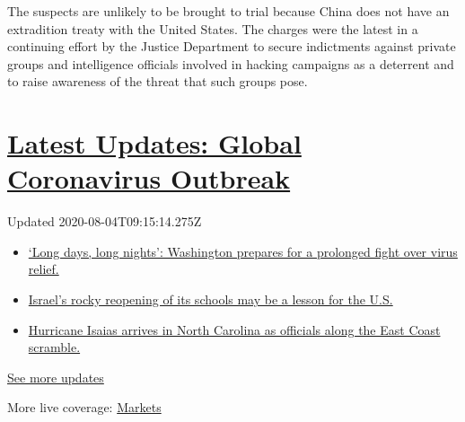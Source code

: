 The suspects are unlikely to be brought to trial because China does not
have an extradition treaty with the United States. The charges were the
latest in a continuing effort by the Justice Department to secure
indictments against private groups and intelligence officials involved
in hacking campaigns as a deterrent and to raise awareness of the threat
that such groups pose.

\hypertarget{latest-updates-global-coronavirus-outbreak}{%
\section{\texorpdfstring{\href{https://www.nytimes3xbfgragh.onion/2020/08/04/world/coronavirus-covid-19.html?action=click\&pgtype=Article\&state=default\&region=MAIN_CONTENT_1\&context=storylines_live_updates}{Latest
Updates: Global Coronavirus
Outbreak}}{Latest Updates: Global Coronavirus Outbreak}}\label{latest-updates-global-coronavirus-outbreak}}

Updated 2020-08-04T09:15:14.275Z

\begin{itemize}
\tightlist
\item
  \href{https://www.nytimes3xbfgragh.onion/2020/08/04/world/coronavirus-covid-19.html?action=click\&pgtype=Article\&state=default\&region=MAIN_CONTENT_1\&context=storylines_live_updates\#link-6b644638}{`Long
  days, long nights': Washington prepares for a prolonged fight over
  virus relief.}
\item
  \href{https://www.nytimes3xbfgragh.onion/2020/08/04/world/coronavirus-covid-19.html?action=click\&pgtype=Article\&state=default\&region=MAIN_CONTENT_1\&context=storylines_live_updates\#link-7af9fca0}{Israel's
  rocky reopening of its schools may be a lesson for the U.S.}
\item
  \href{https://www.nytimes3xbfgragh.onion/2020/08/04/world/coronavirus-covid-19.html?action=click\&pgtype=Article\&state=default\&region=MAIN_CONTENT_1\&context=storylines_live_updates\#link-33bf9168}{Hurricane
  Isaias arrives in North Carolina as officials along the East Coast
  scramble.}
\end{itemize}

\href{https://www.nytimes3xbfgragh.onion/2020/08/04/world/coronavirus-covid-19.html?action=click\&pgtype=Article\&state=default\&region=MAIN_CONTENT_1\&context=storylines_live_updates}{See
more updates}

More live coverage:
\href{https://www.nytimes3xbfgragh.onion/live/2020/08/03/business/stock-market-today-coronavirus?action=click\&pgtype=Article\&state=default\&region=MAIN_CONTENT_1\&context=storylines_live_updates}{Markets}

